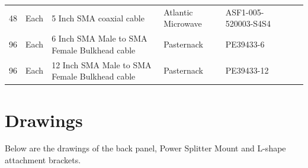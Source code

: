 \documentclass[12pt,a4paper,oneside]{article}
\begin{document}
\begin{landscape}
\begin{table}[H]
{\begin{tabular}{@{}lllllll@{}}
48 & Each & 5 Inch SMA coaxial cable & Atlantic Microwave & ASF1-005-520003-S4S4 &&\\
96 & Each & 6 Inch SMA Male to SMA Female Bulkhead cable & Pasternack & PE39433-6 &&\\
96 & Each & 12 Inch SMA Male to SMA Female Bulkhead cable & Pasternack & PE39433-12 &&\\
\bottomrule            
\end{tabular}}
\label{tab:IF_components}
\end{table}


\section{Drawings}
\label{sec:Drawings}
Below are the drawings of the back panel, Power Splitter Mount and L-shape attachment brackets.





\end{landscape}

%
%
\end{document}

